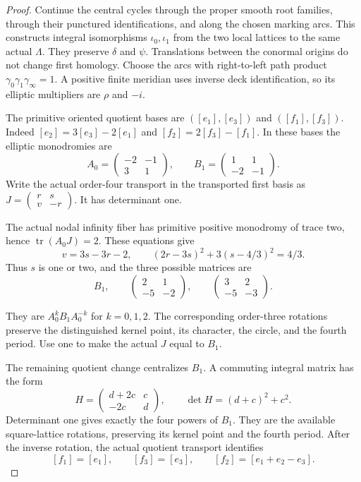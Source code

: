 \documentclass[11pt]{article}
\numberwithin{equation}{section}
\begin{document}
\begin{proof}
Continue the central cycles through the proper smooth root families,
through their punctured identifications, and along the chosen marking
arcs. This constructs integral isomorphisms $\iota_0,\iota_1$ from
the two local lattices to the same actual $\Lambda$. They preserve
$\delta$ and $\psi$. Translations between the conormal origins do
not change first homology. Choose the arcs with right-to-left path
product $\gamma_0\gamma_1\gamma_\infty=1$. A positive finite
meridian uses inverse deck identification, so its elliptic
multipliers are $\rho$ and $-i$.

The primitive oriented quotient bases are $([e_1],[e_3])$ and
$([f_1],[f_3])$. Indeed $[e_2]=3[e_3]-2[e_1]$ and
$[f_2]=2[f_3]-[f_1]$. In these bases the elliptic monodromies are
\[
 A_0=\begin{pmatrix}-2&-1\\3&1\end{pmatrix},\qquad
 B_1=\begin{pmatrix}1&1\\-2&-1\end{pmatrix}.
\]
Write the actual order-four transport in the transported first
basis as $J=\left(\begin{smallmatrix}r&s\\v&-r\end{smallmatrix}\right)$.
It has determinant one.

The actual nodal infinity fiber has
primitive positive monodromy of trace two, hence
$\operatorname{tr}(A_0J)=2$. These equations give
\[
 v=3s-3r-2,\qquad
 (2r-3s)^2+3(s-4/3)^2=4/3.
\]
Thus $s$ is one or two, and the three possible matrices are
\[
 B_1,\qquad
 \begin{pmatrix}2&1\\-5&-2\end{pmatrix},\qquad
 \begin{pmatrix}3&2\\-5&-3\end{pmatrix}.
\]

They are $A_0^kB_1A_0^{-k}$ for $k=0,1,2$. The corresponding
order-three rotations preserve the distinguished kernel point, its
character, the circle, and the fourth period. Use one to make the
actual $J$ equal to $B_1$.

The remaining quotient change centralizes $B_1$. A commuting
integral matrix has the form
\[
 H=\begin{pmatrix}d+2c&c\\-2c&d\end{pmatrix},\qquad
 \det H=(d+c)^2+c^2.
\]
Determinant one gives exactly the four powers of $B_1$. They are
the available square-lattice rotations, preserving its kernel
point and the fourth period. After the inverse rotation, the
actual quotient transport identifies
\[
 [f_1]=[e_1],\qquad[f_3]=[e_3],\qquad
 [f_2]=[e_1+e_2-e_3].
\]


\end{proof}
\end{document}
